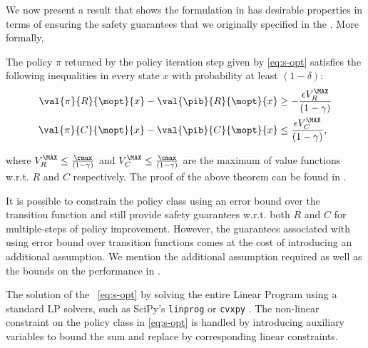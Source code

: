 

We now present a result that shows the formulation in  has desirable properties in terms of ensuring the safety guarantees that we originally specified in the . More formally,
\begin{prop}
\label{thm:eQ-guarantee}
    The policy $\pi$ returned by the policy iteration step given by \ref{eq:s-opt} satisfies the following inequalities in every state $x$ with probability at least $(1 - \delta)$:
    \begin{align*}
        \val{\pi}{R}{\mopt}{x} - \val{\pib}{R}{\mopt}{x} &\geq - \frac{\epsilon V_{R}^{\MAX}}{(1 - \gamma)} \\ 
        \val{\pi}{C}{\mopt}{x} -  \val{\pib}{C}{\mopt}{x} &\leq \frac{\epsilon V_{C}^{\MAX}}{(1 - \gamma)},
    \end{align*}
\end{prop}
where $V_{R}^{\MAX} \leq \frac{\rmax}{(1-\gamma)}$ and $V_{C}^{\MAX} \leq \frac{\cmax}{(1-\gamma)}$ are the maximum of value functions w.r.t. $R$ and $C$ respectively. The proof of the above theorem can be found in .

It is possible to constrain the policy class using an error bound over the transition function and still provide safety guarantees w.r.t. both $R$ and $C$ for multiple-steps of policy improvement. However, the guarantees associated with using error bound over transition functions comes at the cost of introducing an additional assumption. We mention the additional assumption required as well as the bounds on the performance in .



The solution of the ~\ref{eq:s-opt} by solving the entire Linear Program using a standard LP solvers, such as SciPy's \texttt{linprog} \citep{SciPy-NMeth} or \texttt{cvxpy} \citep{diamond2016cvxpy}. The non-linear constraint on the policy class in \cref{eq:s-opt} is handled by introducing auxiliary variables to bound the sum and replace by corresponding linear constraints.
